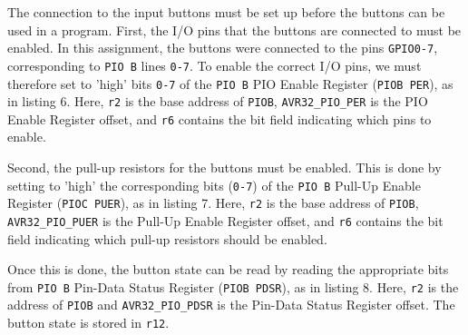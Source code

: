 The connection to the input buttons must be set up before the buttons can be used in a program.
First, the I/O pins that the buttons are connected to must be enabled.
In this assignment, the buttons were connected to the pins \texttt{GPIO0-7}, corresponding to \texttt{PIO B} lines \texttt{0-7}.
To enable the correct I/O pins, we must therefore set to 'high' bits \texttt{0-7} of the \texttt{PIO B} PIO Enable Register (\texttt{PIOB PER}), as in listing 6.
Here, \texttt{r2} is the base address of \texttt{PIOB}, \texttt{AVR32\_PIO\_PER} is the PIO Enable Register offset, and \texttt{r6} contains the bit field indicating which pins to enable.


Second, the pull-up resistors for the buttons must be enabled.
This is done by setting to 'high' the corresponding bits (\texttt{0-7}) of the \texttt{PIO B} Pull-Up Enable Register (\texttt{PIOC PUER}), as in listing 7.
Here, \texttt{r2} is the base address of \texttt{PIOB}, \texttt{AVR32\_PIO\_PUER} is the Pull-Up Enable Register offset, and \texttt{r6} contains the bit field indicating which pull-up resistors should be enabled.


Once this is done, the button state can be read by reading the appropriate bits from \texttt{PIO B} Pin-Data Status Register (\texttt{PIOB PDSR}), as in listing 8.
Here, \texttt{r2} is the address of \texttt{PIOB} and \texttt{AVR32\_PIO\_PDSR} is the Pin-Data Status Register offset.
The button state is stored in \texttt{r12}.

